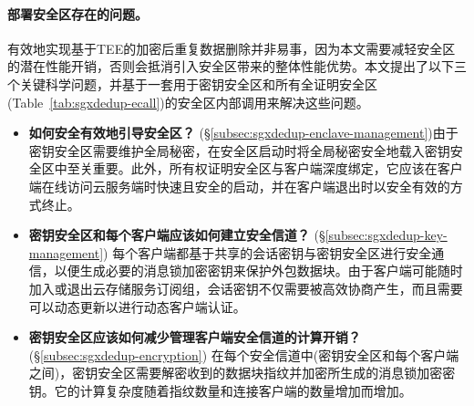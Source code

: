 \paragraph*{部署安全区存在的问题。}有效地​​实现基于TEE的加密后重复数据删除并非易事，因为本文需要减轻安全区的潜在性能开销，否则会抵消引入安全区带来的整体性能优势。本文提出了以下三个关键科学问题，并基于一套用于密钥安全区和所有全证明安全区(Table~\ref{tab:sgxdedup-ecall})的安全区内部调用来解决这些问题。

\begin{itemize}[leftmargin=0em]
    \item \textbf{如何安全有效地引导安全区？} (\S\ref{subsec:sgxdedup-enclave-management})由于密钥安全区需要维护全局秘密，在安全区启动时将全局秘密安全地载入密钥安全区中至关重要。此外，所有权证明安全区与客户端深度绑定，它应该在客户端在线访问云服务端时快速且安全的启动，并在客户端退出时以安全有效的方式终止。
    \item \textbf{密钥安全区和每个客户端应该如何建立安全信道？} (\S\ref{subsec:sgxdedup-key-management})
          每个客户端都基于共享的会话密钥与密钥安全区进行安全通信，以便生成必要的消息锁加密密钥来保护外包数据块。由于客户端可能随时加入或退出云存储服务订阅组，会话密钥不仅需要被高效协商产生，而且需要可以动态更新以进行动态客户端认证。
    \item \textbf{密钥安全区应该如何减少管理客户端安全信道的计算开销？} (\S\ref{subsec:sgxdedup-encryption})
          在每个安全信道中(密钥安全区和每个客户端之间)，密钥安全区需要解密收到的数据块指纹并加密所生成的消息锁加密密钥。它的计算复杂度随着指纹数量和连接客户端的数量增加而增加。
\end{itemize}
